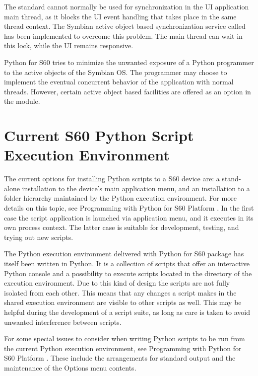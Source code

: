 The standard  cannot normally be used for 
synchronization in the UI application main thread, as it blocks the UI event 
handling that takes place in the same thread context. The Symbian active 
object based synchronization service called  has been 
implemented to overcome this problem. The main thread can wait in this lock, 
while the UI remains responsive.

Python for S60 tries to minimize the unwanted exposure of a Python 
programmer to the active objects of the Symbian OS. The programmer may 
choose to implement the eventual concurrent behavior of the application with 
normal threads. However, certain active object based facilities are offered 
as an option in the  module.

\section{Current S60 Python Script Execution Environment}
\label{subsec:current}

The current options for installing Python scripts to a S60 device are: a 
stand-alone installation to the device's main application menu, and an 
installation to a folder hierarchy maintained by the Python execution 
environment. For more details on this topic, see Programming with Python for 
S60 Platform \cite{PyS60Prog}. In the first case the script application is 
launched via application menu, and it executes in its own process context. The 
latter case is suitable for development, testing, and trying out new scripts.

The Python execution environment delivered with Python for S60 package 
has itself been written in Python. It is a collection of scripts that offer 
an interactive Python console and a possibility to execute scripts located 
in the directory of the execution environment. Due to this kind of design 
the scripts are not fully isolated from each other. This means that any 
changes a script makes in the shared execution environment are visible to 
other scripts as well. This may be helpful during the development of a 
script suite, as long as care is taken to avoid unwanted interference 
between scripts.

For some special issues to consider when writing Python scripts to be run from 
the current Python execution environment, see Programming with Python for S60 Platform \cite{PyS60Prog}. These include the arrangements for standard output 
and the maintenance of the Options menu contents.

